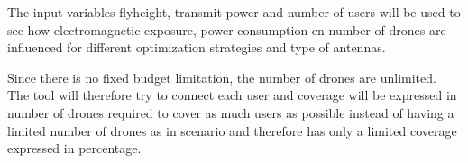 The input variables flyheight, transmit power and number of users will be used to see how electromagnetic exposure, power consumption en number of drones are influenced for
different optimization strategies and type of antennas.

Since there is no fixed budget limitation, the number of drones are unlimited. The tool will therefore try to connect each user and
coverage will be expressed in number of drones required to cover as much users as possible instead of having a limited number of drones  
as in scenario and therefore has only a limited coverage expressed in percentage.
